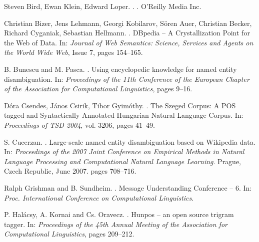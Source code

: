 \documentclass[11pt]{article}
\begin{document}
\begin{thebibliography}{}


Steven Bird, Ewan Klein, Edward Loper.
.
.
\newblock O'Reilly Media Inc.

Christian Bizer, Jens Lehmann, Georgi Kobilarov, Sören Auer, Christian Becker, Richard Cyganiak, Sebastian Hellmann.
.
\newblock DBpedia -- A Crystallization Point for the Web of Data. 
\newblock In: {\em Journal of Web Semantics: Science, Services and Agents on the World Wide Web}, Issue 7, pages 154--165.

B. Bunescu and M. Pasca.
.
\newblock Using encyclopedic knowledge for named entity disambiguation.
\newblock In: {\em Proceedings of the 11th Conference of the European Chapter of the Association for Computational Linguistics}, pages 9--16.

Dóra Csendes, János Csirik, Tibor Gyimóthy.
.
\newblock The Szeged Corpus: A POS tagged and Syntactically Annotated Hungarian Natural Language Corpus. 
\newblock In: {\em Proceedings of TSD 2004}, vol. 3206, pages 41--49.

S. Cucerzan.
.
\newblock Large-scale named entity disambiguation based on Wikipedia data.
\newblock In: {\em Proceedings of the 2007 Joint Conference on Empirical Methods in Natural Language Processing and Computational Natural Language Learning}.
\newblock Prague, Czech Republic, June 2007. pages 708--716.

Ralph Grishman and B. Sundheim.
.
\newblock Message Understanding Conference -- 6. 
\newblock In: {\em Proc. International Conference on Computational Linguistics}.

P. Halácsy, A. Kornai and Cs. Oravecz.
.
\newblock Hunpos -- an open source trigram tagger. 
\newblock In: {\em Proceedings of the 45th Annual Meeting of the Association for Computational Linguistics}, pages 209--212.


\end{thebibliography}
\end{document}
